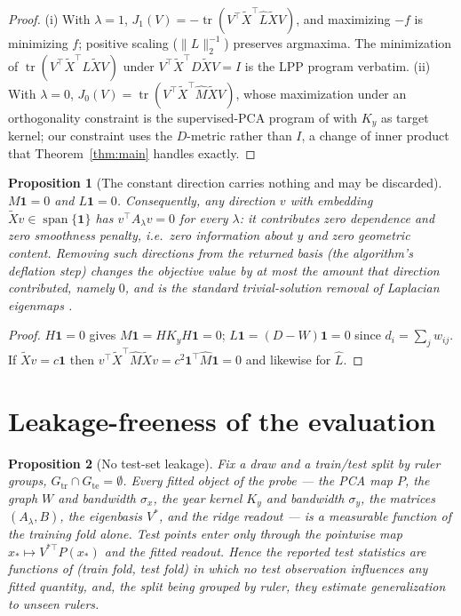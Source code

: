 \documentclass[11pt]{article}
\newtheorem{proposition}{Proposition}
\theoremstyle{remark}
\newcommand{\tr}{\operatorname{tr}}
\newcommand{\Xt}{\widetilde{X}}
\newcommand{\Mh}{\widehat{M}}
\newcommand{\Lh}{\widehat{L}}
\begin{document}
\begin{proof}
(i) With $\lambda=1$, $J_1(V)=-\tr(V^{\!\top}\Xt^{\!\top}\Lh\Xt V)$, and maximizing $-f$
is minimizing $f$; positive scaling ($\|L\|_2^{-1}$) preserves argmaxima. The
minimization of $\tr(V^{\!\top}\Xt^{\!\top}L\Xt V)$ under $V^{\!\top}\Xt^{\!\top}D\Xt
V=I$ is the LPP program verbatim. (ii) With $\lambda=0$,
$J_0(V)=\tr(V^{\!\top}\Xt^{\!\top}\Mh\Xt V)$, whose maximization under an
orthogonality constraint is the supervised-PCA program of \cite{barshan2011spca} with
$K_y$ as target kernel; our constraint uses the $D$-metric rather than $I$, a
change of inner product that Theorem~\ref{thm:main} handles exactly.
\end{proof}

\begin{proposition}[The constant direction carries nothing and may be discarded]
\label{prop:trivial}
$M\mathbf 1 = 0$ and $L\mathbf 1 = 0$. Consequently, any direction $v$ with embedding
$\Xt v\in\operatorname{span}\{\mathbf 1\}$ has $v^{\!\top}A_\lambda v=0$ for every
$\lambda$: it contributes zero dependence and zero smoothness penalty, i.e.\ zero
information about $y$ and zero geometric content. Removing such directions from the
returned basis (the algorithm's deflation step) changes the objective value by at most
the amount that direction contributed, namely $0$, and is the standard trivial-solution
removal of Laplacian eigenmaps \cite{belkin2003}.
\end{proposition}

\begin{proof}
$H\mathbf 1=0$ gives $M\mathbf 1=HK_yH\mathbf 1=0$; $L\mathbf 1=(D-W)\mathbf 1=0$ since
$d_i=\sum_jw_{ij}$. If $\Xt v=c\mathbf 1$ then
$v^{\!\top}\Xt^{\!\top}\Mh\Xt v=c^2\mathbf 1^{\!\top}\Mh\mathbf 1=0$ and likewise for
$\Lh$.
\end{proof}

\section{Leakage-freeness of the evaluation}

\begin{proposition}[No test-set leakage]\label{prop:leakage}
Fix a draw and a train/test split by ruler groups, $G_{\mathrm{tr}}\cap
G_{\mathrm{te}}=\emptyset$. Every fitted object of the probe --- the PCA map $P$, the
graph $W$ and bandwidth $\sigma_x$, the year kernel $K_y$ and bandwidth $\sigma_y$, the
matrices $(A_\lambda,B)$, the eigenbasis $V^\ast$, and the ridge readout --- is a
measurable function of the training fold alone. Test points enter only through the
pointwise map $x_\ast\mapsto V^{\ast\top}P(x_\ast)$ and the fitted readout. Hence the
reported test statistics are functions of (train fold, test fold) in which no test
observation influences any fitted quantity, and, the split being grouped by ruler, they
estimate generalization to unseen rulers.
\end{proposition}
\end{document}
